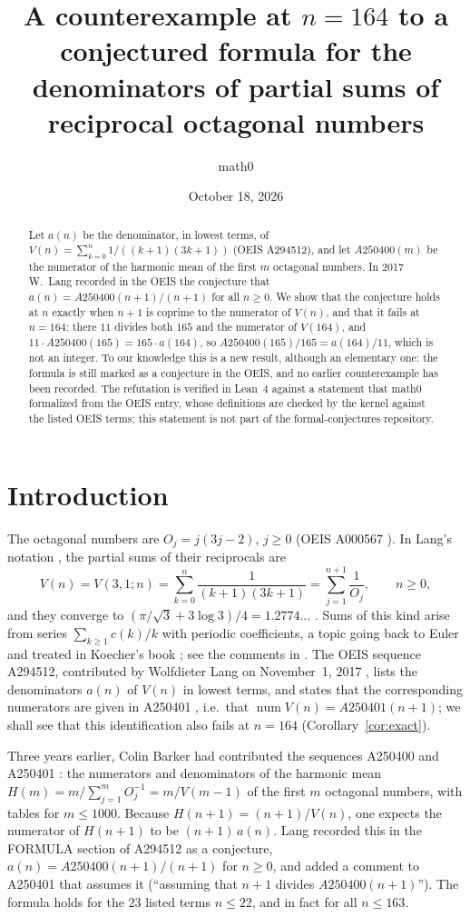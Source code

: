 \documentclass[11pt]{amsart}
\title[Lang's formula for OEIS A294512 fails at $n=164$]{A counterexample at $n=164$ to a conjectured formula for the denominators of partial sums of reciprocal octagonal numbers}
\author{math0}
\date{October 18, 2026}
\theoremstyle{plain}
\theoremstyle{definition}
\DeclareMathOperator{\num}{num}
\begin{document}
\begin{abstract}
Let $a(n)$ be the denominator, in lowest terms, of $V(n)=\sum_{k=0}^{n}1/((k+1)(3k+1))$ (OEIS A294512), and let $A250400(m)$ be the numerator of the harmonic mean of the first $m$ octagonal numbers.
In 2017 W.~Lang recorded in the OEIS the conjecture that $a(n)=A250400(n+1)/(n+1)$ for all $n\ge 0$.
We show that the conjecture holds at $n$ exactly when $n+1$ is coprime to the numerator of $V(n)$, and that it fails at $n=164$: there $11$ divides both $165$ and the numerator of $V(164)$, and $11\cdot A250400(165)=165\cdot a(164)$, so $A250400(165)/165=a(164)/11$, which is not an integer.
To our knowledge this is a new result, although an elementary one: the formula is still marked as a conjecture in the OEIS, and no earlier counterexample has been recorded.
The refutation is verified in Lean~4 against a statement that math0 formalized from the OEIS entry, whose definitions are checked by the kernel against the listed OEIS terms; this statement is not part of the formal-conjectures repository.
\end{abstract}
\maketitle

\section{Introduction}

The octagonal numbers are $O_j=j(3j-2)$, $j\ge 0$ (OEIS A000567 \cite{A000567}). In Lang's notation \cite{A294512}, the partial sums of their reciprocals are
\[
  V(n)=V(3,1;n)=\sum_{k=0}^{n}\frac{1}{(k+1)(3k+1)}=\sum_{j=1}^{n+1}\frac{1}{O_j},\qquad n\ge 0,
\]
and they converge to $(\pi/\sqrt3+3\log 3)/4=1.2774\ldots$ \cite{A294512}.
Sums of this kind arise from series $\sum_{k\ge1}c(k)/k$ with periodic coefficients, a topic going back to Euler and treated in Koecher's book \cite[pp.~189--193]{Koe}; see the comments in \cite{A294512}.
The OEIS sequence A294512, contributed by Wolfdieter Lang on November~1, 2017 \cite{A294512}, lists the denominators $a(n)$ of $V(n)$ in lowest terms, and states that the corresponding numerators are given in A250401 \cite{A250401}, i.e.\ that $\num V(n)=A250401(n+1)$; we shall see that this identification also fails at $n=164$ (Corollary~\ref{cor:exact}).

Three years earlier, Colin Barker had contributed the sequences A250400 and A250401 \cite{A250400,A250401}: the numerators and denominators of the harmonic mean $H(m)=m/\sum_{j=1}^{m}O_j^{-1}=m/V(m-1)$ of the first $m$ octagonal numbers, with tables for $m\le 1000$.
Because $H(n+1)=(n+1)/V(n)$, one expects the numerator of $H(n+1)$ to be $(n+1)\,a(n)$.
Lang recorded this in the FORMULA section of A294512 as a conjecture, $a(n)=A250400(n+1)/(n+1)$ for $n\ge 0$, and added a comment to A250401 that assumes it (``assuming that $n+1$ divides $A250400(n+1)$'').
The formula holds for the $23$ listed terms $n\le 22$, and in fact for all $n\le 163$.
\end{document}
